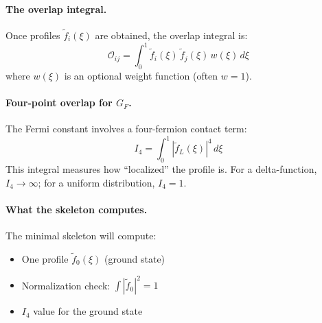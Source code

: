 \paragraph{The overlap integral.}
Once profiles $\tilde{f}_i(\xi)$ are obtained, the overlap integral is:
\begin{equation}
    \mathcal{O}_{ij} = \int_0^1 \tilde{f}_i(\xi) \, \tilde{f}_j(\xi) \, w(\xi) \, d\xi
    \label{eq:bvp_overlap}
\end{equation}
where $w(\xi)$ is an optional weight function (often $w = 1$).

\paragraph{\texorpdfstring{Four-point overlap for $G_F$.}{Four-point overlap for GF.}}
The Fermi constant involves a four-fermion contact term:
\begin{equation}
    I_4 = \int_0^1 |\tilde{f}_L(\xi)|^4 \, d\xi
    \label{eq:bvp_I4}
\end{equation}
This integral measures how ``localized'' the profile is. For a delta-function,
$I_4 \to \infty$; for a uniform distribution, $I_4 = 1$.

\paragraph{What the skeleton computes.}
The minimal skeleton will compute:
\begin{itemize}[nosep]
    \item One profile $\tilde{f}_0(\xi)$ (ground state)
    \item Normalization check: $\int |\tilde{f}_0|^2 = 1$
    \item $I_4$ value for the ground state
\end{itemize}


